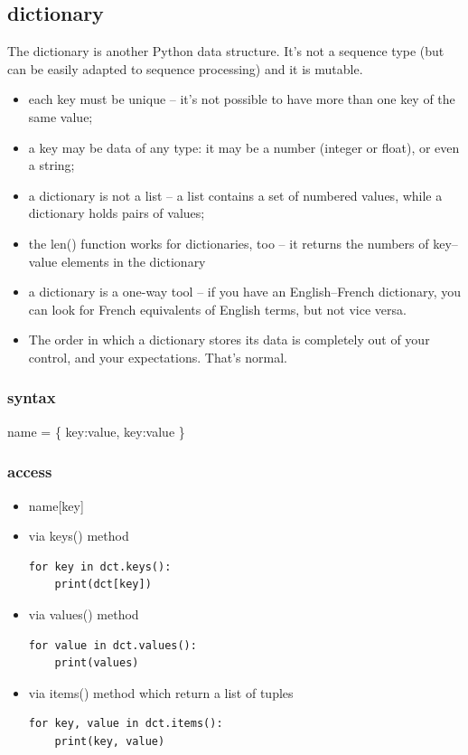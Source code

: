 \documentclass[11pt]{article}
\begin{document}
\subsection{dictionary}
\label{sec:orgef588f5}
The dictionary is another Python data structure. It’s not a sequence
type (but can be easily adapted to sequence processing) and it is
mutable.
\begin{itemize}
\item each key must be unique – it’s not possible to have more than one
key of the same value;
\item a key may be data of any type: it may be a number (integer or
float), or even a string;
\item a dictionary is not a list – a list contains a set of numbered
values, while a dictionary holds pairs of values;
\item the len() function works for dictionaries, too – it returns the
numbers of key–value elements in the dictionary
\item a dictionary is a one-way tool – if you have an English–French
dictionary, you can look for French equivalents of English terms,
but not vice versa.
\item The order in which a dictionary stores its data is completely out of
your control, and your expectations. That’s normal.
\end{itemize}

\subsubsection{syntax}
\label{sec:org179b6ea}
name = \{ key:value, key:value \}

\subsubsection{access}
\label{sec:orga3a16e3}
\begin{itemize}
\item name[key]

\item via keys() method
\begin{verbatim}
for key in dct.keys():
    print(dct[key])
\end{verbatim}

\item via values() method
\begin{verbatim}
for value in dct.values():
    print(values)
\end{verbatim}

\item via items() method which return a list of tuples
\begin{verbatim}
for key, value in dct.items():
    print(key, value)
\end{verbatim}
\end{itemize}
\end{document}

